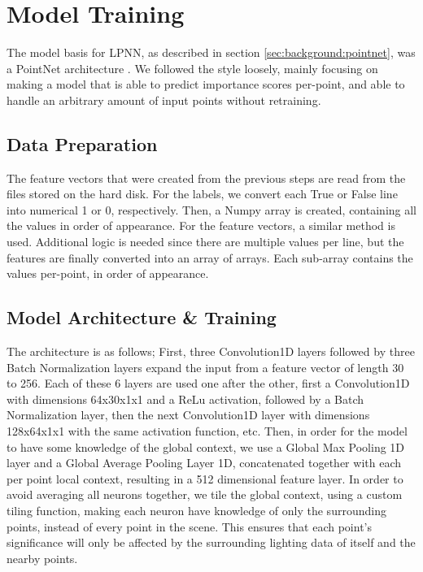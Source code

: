 \section{Model Training}
\label{sec:model_training}

The model basis for LPNN, as described in section \ref{sec:background:pointnet}, was a PointNet architecture \parencite{PointNet2017}. We followed the style loosely, mainly focusing on making a model that is able to predict importance scores per-point, and able to handle an arbitrary amount of input points without retraining. 

\subsection{Data Preparation}
The feature vectors that were created from the previous steps are read from the files stored on the hard disk. For the labels, we convert each True or False line into numerical 1 or 0, respectively. Then, a Numpy array is created, containing all the values in order of appearance.
For the feature vectors, a similar method is used. Additional logic is needed since there are multiple values per line, but the features are finally converted into an array of arrays. Each sub-array contains the values per-point, in order of appearance.

\subsection{Model Architecture \& Training}

The architecture is as follows; First, three Convolution1D layers followed by three Batch Normalization layers expand the input from a feature vector of length 30 to 256. Each of these 6 layers are used one after the other, first a Convolution1D with dimensions 64x30x1x1 and a ReLu activation, followed by a Batch Normalization layer, then the next Convolution1D layer with dimensions 128x64x1x1 with the same activation function, etc. Then, in order for the model to have some knowledge of the global context, we use a Global Max Pooling 1D layer and a Global Average Pooling Layer 1D, concatenated together with each per point local context, resulting in a 512 dimensional feature layer. In order to avoid averaging all neurons together, we tile the global context, using a custom tiling function, making each neuron have knowledge of only the surrounding points, instead of every point in the scene. This ensures that each point's significance will only be affected by the surrounding lighting data of itself and the nearby points.

